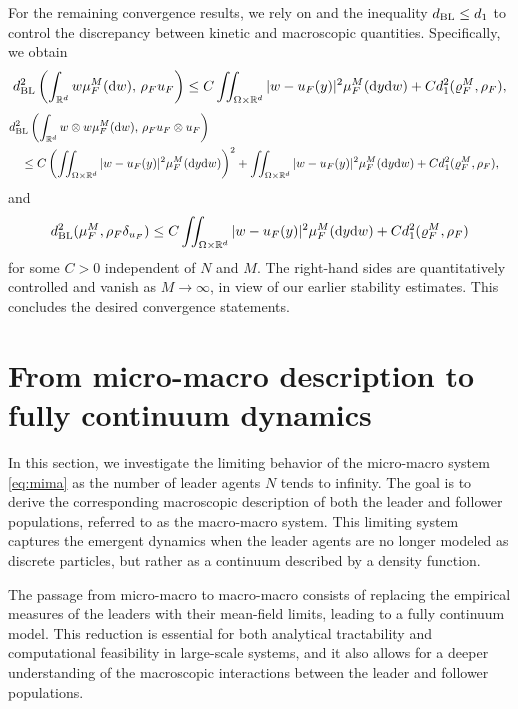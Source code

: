 \documentclass[10pt, reqno]{amsart}
\theoremstyle{definition}
\theoremstyle{remark}
\numberwithin{equation}{section}
\newcommand{\dy}{\textnormal{d}y}
\newcommand{\dw}{\textnormal{d}w}
\newcommand{\R}{\mathbb{R}}
\begin{document}
For the remaining convergence results, we rely on \cite[Lemma 2.1]{CC21} and the inequality $d_{\rm BL} \leq d_1$ to control the discrepancy between kinetic and macroscopic quantities. Specifically, we obtain
\begin{equation} \label{mimi: Conv1 Proof}
d_{\rm BL}^2\left(\int_{\R^d}w\mu_F^{M}(\dw),\, \rho_F u_F \right) \leq C\iint_{\Omega \times \R^d} |w - u_F(y)|^2 \mu_F^{M}(\dy \dw) + Cd_{1}^2(\varrho_F^M,\rho_F), 
\end{equation}
\begin{equation} \label{mimi: Conv2 Proof}
\begin{split}
&d_{\rm BL}^2\left(\int_{\R^d}w\otimes w \mu_F^{M}(\dw),\, \rho_F u_F \otimes u_F \right) \cr
&\quad \leq C\left(\iint_{\Omega \times \R^d} |w - u_F(y)|^2 \mu_F^{M}(\dy \dw)\right)^2 + \iint_{\Omega \times \R^d} |w - u_F(y)|^2 \mu_F^{M}(\dy \dw) +  Cd_{1}^2(\varrho_F^M,\rho_F), 
\end{split}
\end{equation}
and
\[
d_{\rm BL}^2 (\mu_F^M, \rho_F \delta_{u_F}) \leq C\iint_{\Omega \times \R^d} |w - u_F(y)|^2 \mu_F^{M}(\dy \dw) + Cd_{1}^2(\varrho_F^M,\rho_F)
\]
for some $C>0$ independent of $N$ and $M$. The right-hand sides are quantitatively controlled and vanish as $M \to \infty$, in view of our earlier stability estimates. This concludes the desired convergence statements.



%
%
%
%
%
%
%
%
%
%
%
%
\section{From micro-macro description to fully continuum dynamics}\label{sec:mima-mama}

In this section, we investigate the limiting behavior of the micro-macro system \eqref{eq:mima} as the number of leader agents $N$ tends to infinity. The goal is to derive the corresponding macroscopic description of both the leader and follower populations, referred to as the macro-macro system. This limiting system captures the emergent dynamics when the leader agents are no longer modeled as discrete particles, but rather as a continuum described by a density function.

The passage from micro-macro to macro-macro consists of replacing the empirical measures of the leaders with their mean-field limits, leading to a fully continuum model. This reduction is essential for both analytical tractability and computational feasibility in large-scale systems, and it also allows for a deeper understanding of the macroscopic interactions between the leader and follower populations.
\end{document}
